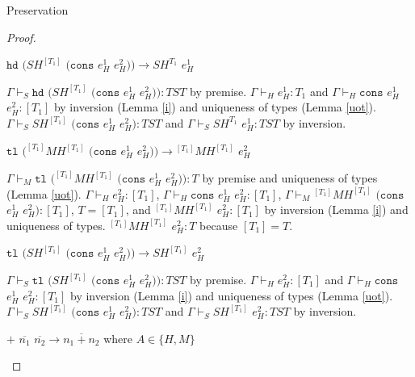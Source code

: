 \begin{theorem}{Preservation}
\begin{proof}

\begin{case}
$\mathtt{hd}$ $(SH^{[T_{1}]}$ $(\mathtt{cons}$ $e_{H}^{1}$ $e_{H}^{2}))\rightarrow SH^{T_{1}}$ $e_{H}^{1}$

$\Gamma\vdash_{S}\mathtt{hd}$ $(SH^{[T_{1}]}$ $(\mathtt{cons}$ $e_{H}^{1}$ $e_{H}^{2})):TST$ by premise.  $\Gamma\vdash_{H}e_{H}^{1}:T_{1}$ and $\Gamma\vdash_{H}\mathtt{cons}$ $e_{H}^{1}$ $e_{H}^{2}:[T_{1}]$ by inversion (Lemma \ref{i}) and uniqueness of types (Lemma \ref{uot}).  $\Gamma\vdash_{S}SH^{[T_{1}]}$ $(\mathtt{cons}$ $e_{H}^{1}$ $e_{H}^{2}):TST$ and $\Gamma\vdash_{S}SH^{T_{1}}$ $e_{H}^{1}:TST$ by inversion.
\end{case}


\begin{case}
$\mathtt{tl}$ $(^{[T_{1}]}MH^{[T_{1}]}$ $(\mathtt{cons}$ $e_{H}^{1}$ $e_{H}^{2}))\rightarrow{^{[T_{1}]}M}H^{[T_{1}]}$ $e_{H}^{2}$

$\Gamma\vdash_{M}\mathtt{tl}$ $(^{[T_{1}]}MH^{[T_{1}]}$ $(\mathtt{cons}$ $e_{H}^{1}$ $e_{H}^{2})):T$ by premise and uniqueness of types (Lemma \ref{uot}).  $\Gamma\vdash_{H}e_{H}^{2}:[T_{1}]$, $\Gamma\vdash_{H}\mathtt{cons}$ $e_{H}^{1}$ $e_{H}^{2}:[T_{1}]$, $\Gamma\vdash_{M}{^{[T_{1}]}M}H^{[T_{1}]}$ $(\mathtt{cons}$ $e_{H}^{1}$ $e_{H}^{2}):[T_{1}]$, $T=[T_{1}]$, and $^{[T_{1}]}MH^{[T_{1}]}$ $e_{H}^{2}:[T_{1}]$ by inversion (Lemma \ref{i}) and uniqueness of types.  $^{[T_{1}]}MH^{[T_{1}]}$ $e_{H}^{2}:T$ because $[T_{1}]=T$.
\end{case}


\begin{case}
$\mathtt{tl}$ $(SH^{[T_{1}]}$ $(\mathtt{cons}$ $e_{H}^{1}$ $e_{H}^{2}))\rightarrow SH^{[T_{1}]}$ $e_{H}^{2}$

$\Gamma\vdash_{S}\mathtt{tl}$ $(SH^{[T_{1}]}$ $(\mathtt{cons}$ $e_{H}^{1}$ $e_{H}^{2})):TST$ by premise.  $\Gamma\vdash_{H}e_{H}^{2}:[T_{1}]$ and $\Gamma\vdash_{H}\mathtt{cons}$ $e_{H}^{1}$ $e_{H}^{2}:[T_{1}]$ by inversion (Lemma \ref{i}) and uniqueness of types (Lemma \ref{uot}).  $\Gamma\vdash_{S}SH^{[T_{1}]}$ $(\mathtt{cons}$ $e_{H}^{1}$ $e_{H}^{2}):TST$ and $\Gamma\vdash_{S}SH^{[T_{1}]}$ $e_{H}^{2}:TST$ by inversion.
\end{case}


\begin{case}
$+$ $\overline{n_{1}}$ $\overline{n_{2}}\rightarrow\overline{n_{1}+n_{2}}$ where $A\in\lbrace H,M\rbrace$


\end{case}
\end{proof}
\end{theorem}
